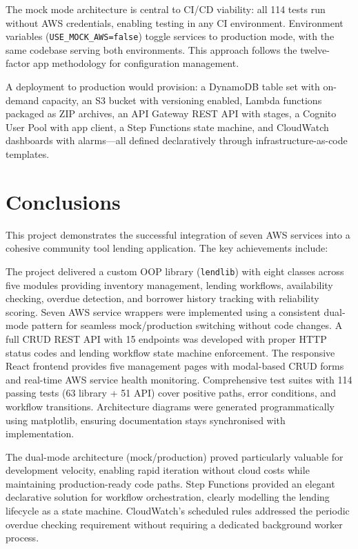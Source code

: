 \documentclass[conference]{IEEEtran}
\begin{document}
The mock mode architecture is central to CI/CD viability: all 114 tests run without AWS credentials, enabling testing in any CI environment. Environment variables (\texttt{USE\_MOCK\_AWS=false}) toggle services to production mode, with the same codebase serving both environments. This approach follows the twelve-factor app methodology for configuration management.

A deployment to production would provision: a DynamoDB table set with on-demand capacity, an S3 bucket with versioning enabled, Lambda functions packaged as ZIP archives, an API Gateway REST API with stages, a Cognito User Pool with app client, a Step Functions state machine, and CloudWatch dashboards with alarms---all defined declaratively through infrastructure-as-code templates.

\section{Conclusions}

This project demonstrates the successful integration of seven AWS services into a cohesive community tool lending application. The key achievements include:

The project delivered a custom OOP library (\texttt{lendlib}) with eight classes across five modules providing inventory management, lending workflows, availability checking, overdue detection, and borrower history tracking with reliability scoring. Seven AWS service wrappers were implemented using a consistent dual-mode pattern for seamless mock/production switching without code changes. A full CRUD REST API with 15 endpoints was developed with proper HTTP status codes and lending workflow state machine enforcement. The responsive React frontend provides five management pages with modal-based CRUD forms and real-time AWS service health monitoring. Comprehensive test suites with 114 passing tests (63 library + 51 API) cover positive paths, error conditions, and workflow transitions. Architecture diagrams were generated programmatically using matplotlib, ensuring documentation stays synchronised with implementation.

The dual-mode architecture (mock/production) proved particularly valuable for development velocity, enabling rapid iteration without cloud costs while maintaining production-ready code paths. Step Functions provided an elegant declarative solution for workflow orchestration, clearly modelling the lending lifecycle as a state machine. CloudWatch's scheduled rules addressed the periodic overdue checking requirement without requiring a dedicated background worker process.
\end{document}
